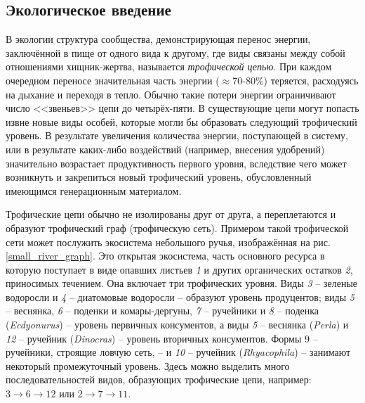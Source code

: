 \subsection{Экологическое введение}
    В экологии структура сообщества, демонстрирующая перенос энергии, заключённой в пище от одного вида к другому, где виды связаны между собой отношениями хищник-жертва, называется \textit{трофической цепью}. При каждом очередном переносе значительная часть энергии (\( \approx \)70-80\%) теряется, расходуясь на дыхание и переходя в тепло. Обычно такие потери энергии ограничивают число <<звеньев>> цепи до четырёх-пяти. В существующие цепи могут попасть извне новые виды особей, которые могли бы образовать следующий трофический уровень. В результате увеличения количества энергии, поступающей в систему, или в результате каких-либо воздействий (например, внесения удобрений) значительно возрастает продуктивность первого уровня, вследствие чего может возникнуть и закрепиться новый трофический уровень, обусловленный имеющимся генерационным материалом.
    
    Трофические цепи обычно не изолированы друг от друга, а переплетаются и образуют трофический граф (трофическую сеть). Примером такой трофической сети может послужить экосистема небольшого ручья\cite{jones_river}, изображённая на рис. \ref{small_river_graph}.
    Это открытая экосистема, часть основного ресурса в которую поступает в виде опавших листьев \textit{1} и других органических остатков \textit{2}, приносимых течением. Она включает три трофических уровня. Виды \textit{3} -- зеленые водоросли и \textit{4} -- диатомовые водоросли -- образуют уровень продуцентов; виды \textit{5} -- веснянка, \textit{6} -- поденки и комары-дергуны, \textit{7} -- ручейники и \textit{8} -- поденка (\textit{Ecdyonurus}) -- уровень первичных консументов, а виды \textit{5} -- веснянка (\textit{Perla}) и \textit{12} -- ручейник (\textit{Dinocras}) -- уровень вторичных консументов. Формы 9 -- ручейники, строящие ловчую сеть, -- и \textit{10} -- ручейник (\textit{Rhyacophila}) -- занимают некоторый промежуточный уровень. Здесь можно выделить много последовательностей видов, образующих трофические цепи, например: \(3 \to 6 \to 12\) или \( 2 \to 7 \to 11 \). 

